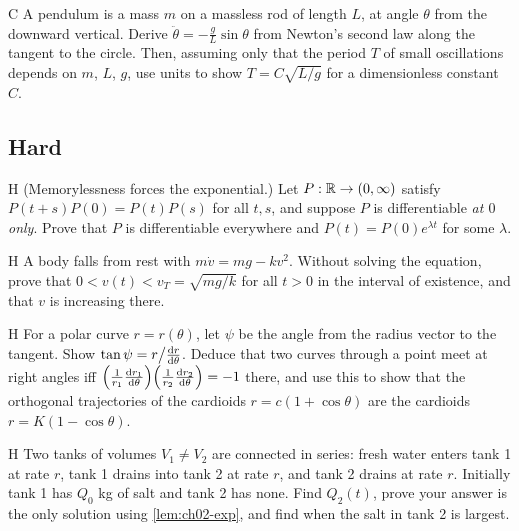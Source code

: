 \begin{problem}{C}\label{prob:ch02-c8}
A pendulum is a mass $m$ on a massless rod of length $L$, at angle $\theta$
from the downward vertical. Derive $\ddot\theta = -\frac{g}{L}\sin\theta$ from
Newton's second law along the tangent to the circle. Then, assuming only that
the period $T$ of small oscillations depends on $m$, $L$, $g$, use units to
show $T = C\sqrt{L/g}$ for a dimensionless constant $C$.
\end{problem}

\subsection*{Hard}

\begin{problem}{H}\label{prob:ch02-h1}
(Memorylessness forces the exponential.) Let $P:\mathbb{R}\to(0,\infty)$ satisfy
$P(t + s)P(0) = P(t)P(s)$ for all $t,s$, and suppose $P$ is differentiable
\emph{at $0$ only}. Prove that $P$ is differentiable everywhere and
$P(t) = P(0)e^{\lambda t}$ for some $\lambda$.
\end{problem}

\begin{problem}{H}\label{prob:ch02-h2}
A body falls from rest with $m\dot v = mg - kv^2$. Without solving the
equation, prove that $0<v(t)<v_T = \sqrt{mg/k}$ for all $t>0$ in the interval
of existence, and that $v$ is increasing there.
\end{problem}

\begin{problem}{H}\label{prob:ch02-h3}
For a polar curve $r = r(\theta)$, let $\psi$ be the angle from the radius
vector to the tangent. Show $\tan\psi = r\big/\frac{\mathrm{d}r}{\mathrm{d}\theta}$. Deduce that
two curves through a point meet at right angles iff
$\Bigl(\frac{1}{r_1}\frac{\mathrm{d}r_1}{\mathrm{d}\theta}\Bigr)\Bigl(\frac{1}{r_2}\frac{\mathrm{d}r_2}{\mathrm{d}\theta}\Bigr) = -1$
there, and use this to show that the orthogonal trajectories of the
cardioids $r = c(1 + \cos\theta)$ are the cardioids $r = K(1 - \cos\theta)$.
\end{problem}

\begin{problem}{H}\label{prob:ch02-h4}
Two tanks of volumes $V_1\neq V_2$ are connected in series: fresh water enters
tank 1 at rate $r$, tank 1 drains into tank 2 at rate $r$, and tank 2 drains at
rate $r$. Initially tank 1 has $Q_0$ kg of salt and tank 2 has none. Find
$Q_2(t)$, prove your answer is the only solution using \cref{lem:ch02-exp},
and find when the salt in tank 2 is largest.
\end{problem}

